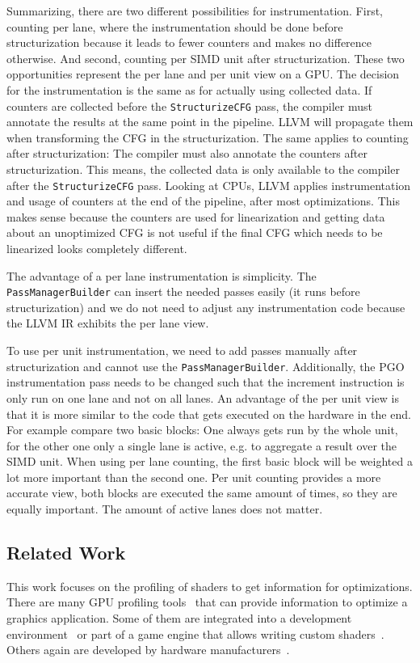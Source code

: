 Summarizing, there are two different possibilities for instrumentation. First, counting per lane, where the instrumentation should be done before structurization because it leads to fewer counters and makes no difference otherwise.
And second, counting per SIMD unit after structurization.
These two opportunities represent the per lane and per unit view on a GPU.
The decision for the instrumentation is the same as for actually using collected data. If counters are collected before the \texttt{StructurizeCFG} pass, the compiler must annotate the results at the same point in the pipeline.
LLVM will propagate them when transforming the CFG in the structurization.
The same applies to counting after structurization: The compiler must also annotate the counters after structurization.
This means, the collected data is only available to the compiler after the \texttt{StructurizeCFG} pass.
Looking at CPUs, LLVM applies instrumentation and usage of counters at the end of the pipeline, after most optimizations.
This makes sense because the counters are used for linearization and getting data about an unoptimized CFG is not useful if the final CFG which needs to be linearized looks completely different.

The advantage of a per lane instrumentation is simplicity. The \texttt{PassManagerBuilder} can insert the needed passes easily (it runs before structurization) and we do not need to adjust any instrumentation code because the LLVM IR exhibits the per lane view.

To use per unit instrumentation, we need to add passes manually after structurization and cannot use the \texttt{PassManagerBuilder}.
Additionally, the PGO instrumentation pass needs to be changed such that the increment instruction is only run on one lane and not on all lanes.
An advantage of the per unit view is that it is more similar to the code that gets executed on the hardware in the end.
For example compare two basic blocks: One always gets run by the whole unit, for the other one only a single lane is active, e.g. to aggregate a result over the SIMD unit.
When using per lane counting, the first basic block will be weighted a lot more important than the second one.
Per unit counting provides a more accurate view, both blocks are executed the same amount of times, so they are equally important. The amount of active lanes does not matter.

\subsection{Related Work}
\label{sub:relatedwork}
This work focuses on the profiling of shaders to get information for optimizations.
There are many GPU profiling tools~\cite{PGI2014} that can provide information to optimize a graphics application.
Some of them are integrated into a development environment~\cite{MSGPUUsage} or part of a game engine that allows writing custom shaders~\cite{UnityGPUProfiler, UnrealGPUProfiling}.
Others again are developed by hardware manufacturers~\cite{NvidiaNsight, NvidiaShaderPerf, AMDShaderAnalyzer}.

